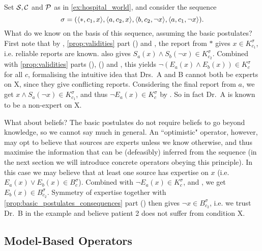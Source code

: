 \begin{example}
    \label{ex:hospital_ex_formalised}
    Set $\mathcal{S}, \mathcal{C}$ and $\mathcal{P}$ as in \cref{ex:hospital_world}, and consider
    the sequence
    \[
        \sigma
        = (
            \langle {\ast, c_1, x} \rangle,
            \langle {a, c_2, x} \rangle,
            \langle {b, c_2, \neg x} \rangle,
            \langle {a, c_1, \neg x} \rangle
        ).
    \]
    What do we know on the basis of this sequence, assuming the basic
    postulates? First note that by \soundness{}, \cref{prop:validities}
    part () and \closure{}, the report from $\ast$ gives $x
    \in K^\sigma_{c_1}$, i.e. reliable reports are known. \soundness{} also
    gives $S_a(x) \land S_b(\neg x) \in K^\sigma_{c_2}$. Combined with
    \cref{prop:validities} parts (),
    () and \closure{}, this yields
    $\neg(E_a(x) \land E_b(x)) \in K^\sigma_c$ for all $c$, formalising the
    intuitive idea that Drs.\ A and B cannot both be experts on X, since they
    give conflicting reports.
    Considering the final report from $a$, we get $x \land S_a(\neg
    x) \in K^\sigma_{c_1}$, and thus $\neg E_a(x) \in K^\sigma_c$ by
    \closure{}. So in fact Dr.\ A is known to be a non-expert on X.

    What about beliefs? The basic postulates do not require beliefs to go
    beyond knowledge, so we cannot say much in general. An ``optimistic"
    operator, however, may opt to believe that sources are experts unless we
    know otherwise, and thus maximise the information that can be (defeasibly)
    inferred from the sequence (in the next section we will introduce
    concrete operators obeying this principle). In this case we may believe
    that at least one source has expertise on $x$ (i.e. $E_a(x) \lor E_b(x) \in
    B^\sigma_c$).  Combined with $\neg E_a(x) \in K^\sigma_c$, \closure{} and
    \containment{}, we get $E_b(x) \in B^\sigma_{c_2}$. Symmetry of expertise
    together with \cref{prop:basic_postulates_consequences} part
    () then gives $\neg x \in
    B^\sigma_{c_2}$, i.e. we trust Dr.\ B in the example and believe patient 2
    does not suffer from condition X.

\end{example}

\subsection{Model-Based Operators}

